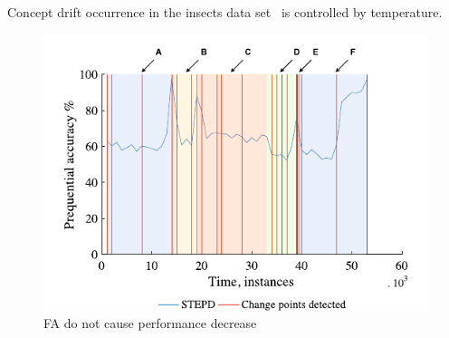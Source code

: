 Concept drift occurrence in the insects data set~\cite{SouzaRMB20} is controlled by temperature.
\begin{figure}[htb!]
	\centering
	\includegraphics[height=0.4\textheight]{images/images_cropped/souza_fig28}
	\caption{FA do not cause performance decrease}
	\label{fig:fig28_souza}
\end{figure}

